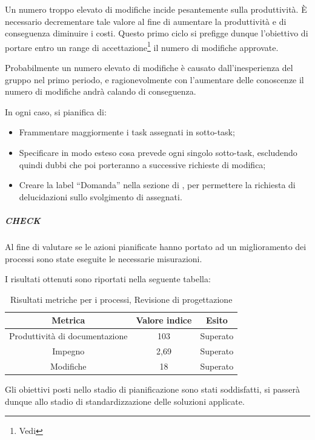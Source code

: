 Un numero troppo elevato di modifiche incide pesantemente sulla produttività. È necessario decrementare tale valore al fine di aumentare la produttività e di conseguenza diminuire i costi. Questo primo ciclo  si prefigge dunque l'obiettivo di portare entro un range di accettazione\footnote{Vedi \PianoDiQualifica} il numero di modifiche approvate.

Probabilmente un numero elevato di modifiche è causato dall'inesperienza del gruppo nel primo periodo, e ragionevolmente con l'aumentare delle conoscenze il numero di modifiche andrà calando di conseguenza. 

In ogni caso, si pianifica di:
\begin{itemize}
\item Frammentare maggiormente i task assegnati in sotto-task;
\item Specificare in modo esteso cosa prevede ogni singolo sotto-task, escludendo quindi dubbi che poi porteranno a successive richieste di modifica;
\item Creare la label ``Domanda'' nella sezione  di , per permettere la richiesta di delucidazioni sullo svolgimento di  assegnati.
\end{itemize}
  
\subparagraph{CHECK}

Al fine di valutare se le azioni pianificate hanno portato ad un miglioramento dei processi sono state eseguite le necessarie misurazioni.

I risultati ottenuti sono riportati nella seguente tabella:
\begin{table}[H]
\centering
\begin{tabular}{ | c | c | c | }
\hline
\textbf{Metrica} & \textbf{Valore indice} & \textbf{Esito} \\
\hline
Produttività di documentazione & 103 & Superato \\
\hline
Impegno & 2,69 & Superato \\
\hline
Modifiche & 18 & Superato \\
\hline
\end{tabular}
\caption{Risultati metriche per i processi, Revisione di progettazione}
\end{table}

Gli obiettivi posti nello stadio di pianificazione sono stati soddisfatti, si passerà dunque allo stadio di standardizzazione delle soluzioni applicate.


\newpage
